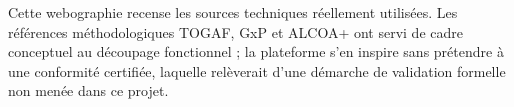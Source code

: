 \begin{remarque}
Cette webographie recense les sources techniques réellement utilisées. Les références
méthodologiques TOGAF, GxP et ALCOA+ ont servi de cadre conceptuel au découpage
fonctionnel ; la plateforme s'en inspire sans prétendre à une conformité certifiée,
laquelle relèverait d'une démarche de validation formelle non menée dans ce projet.
\end{remarque}
